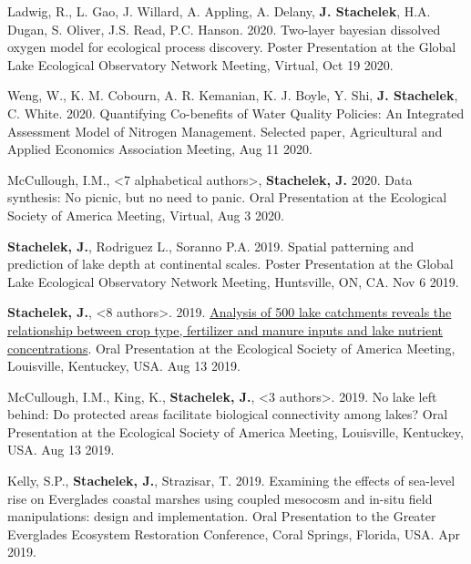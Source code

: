 \documentclass[11pt]{article}
\makeatletter
\newlength{\bibhang}
\newlength{\bibsep}
 {\@listi \global\bibsep\itemsep \global\advance\bibsep by\parsep}
\newenvironment{bibenum*}
  {\renewcommand\labelenumi{[\theenumi]}%
   \etaremune[
     topsep=0pt,
     itemsep=\bibsep,
     parsep=0pt,partopsep=0pt,
     itemindent=-\bibhang,
     leftmargin=0.8em
     ]
     }
  {\endetaremune}
\makeatother
\begin{document}
\begin{bibenum*}

    \item Ladwig, R., L. Gao, J. Willard, A. Appling, A. Delany, \textbf{J. Stachelek}, H.A. Dugan, S. Oliver, J.S. Read, P.C. Hanson. 2020. Two-layer bayesian dissolved oxygen model for ecological process discovery. Poster Presentation at the Global Lake Ecological Observatory Network Meeting, Virtual, Oct 19 2020.

    \item Weng, W., K. M. Cobourn, A. R. Kemanian, K. J. Boyle, Y. Shi, \textbf{J. Stachelek}, C. White. 2020. Quantifying Co-benefits of Water Quality Policies:  An Integrated Assessment Model of Nitrogen Management. Selected paper, Agricultural and Applied Economics Association Meeting, Aug 11 2020.

    \item McCullough, I.M., <7 alphabetical authors>, \textbf{Stachelek, J.} 2020. Data synthesis: No picnic, but no need to panic. Oral Presentation at the Ecological Society of America Meeting, Virtual, Aug 3 2020.

    \item \textbf{Stachelek, J.}, Rodriguez L., Soranno P.A. 2019. Spatial patterning and prediction of lake depth at continental scales. Poster Presentation at the Global Lake Ecological Observatory Network Meeting, Huntsville, ON, CA. Nov 6 2019.

    \item \textbf{Stachelek, J.}, <8 authors>. 2019. \href{https://doi.org/10.6084/m9.figshare.12486164.v2}{Analysis of 500 lake catchments reveals the relationship between crop type, fertilizer and manure inputs and lake nutrient concentrations}. Oral Presentation at the Ecological Society of America Meeting, Louisville, Kentuckey, USA. Aug 13 2019.

    \item McCullough, I.M., King, K., \textbf{Stachelek, J.}, <3 authors>. 2019. No lake left behind: Do protected areas facilitate biological connectivity among lakes? Oral Presentation at the Ecological Society of America Meeting, Louisville, Kentuckey, USA. Aug 13 2019.

    \item Kelly, S.P., \textbf{Stachelek, J.}, Strazisar, T. 2019. Examining the effects of sea-level rise on Everglades coastal marshes using coupled mesocosm and in-situ field manipulations: design and implementation. Oral Presentation to the Greater Everglades Ecosystem Restoration Conference, Coral Springs, Florida, USA. Apr 2019.


\end{bibenum*}
\end{document}
